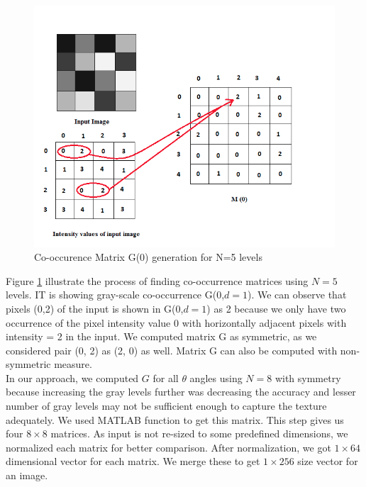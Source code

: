  \begin{center}
\begin{figure}
\centering
\includegraphics[width=\linewidth]{./Pictures/GLCM/process.jpg}
\caption{Co-occurence Matrix G(0\textdegree) generation for N=5 levels }
\label{fig:glcmMatrix}
\end{figure}
\end{center}
 Figure \ref{fig:glcmMatrix} illustrate the process of finding co-occurrence matrices using $N=5$ levels. IT is showing gray-scale co-occurrence G(0\textdegree,$d=1$). We can observe that pixels (0,2) of the input is shown in G(0\textdegree,$d=1$) as 2 because we only have two occurrence of the pixel intensity value 0 with horizontally adjacent pixels with intensity = 2 in the input. We computed matrix G as symmetric, as we considered pair (0, 2) as (2, 0) as well. Matrix G can also be computed with non-symmetric measure.\\
    In our approach, we computed $G$ for all $\theta$ angles using $N=8$ with symmetry because increasing the gray levels further was decreasing the accuracy and lesser number of gray levels may not be sufficient enough to capture the texture adequately. We used MATLAB function to get this matrix. This step gives us four $8 \times 8$ matrices. As input is not re-sized to some predefined dimensions, we normalized each matrix for better comparison. After normalization, we got $1\times 64 $ dimensional vector for each matrix. We merge these to get $1\times 256 $ size vector for an image.
